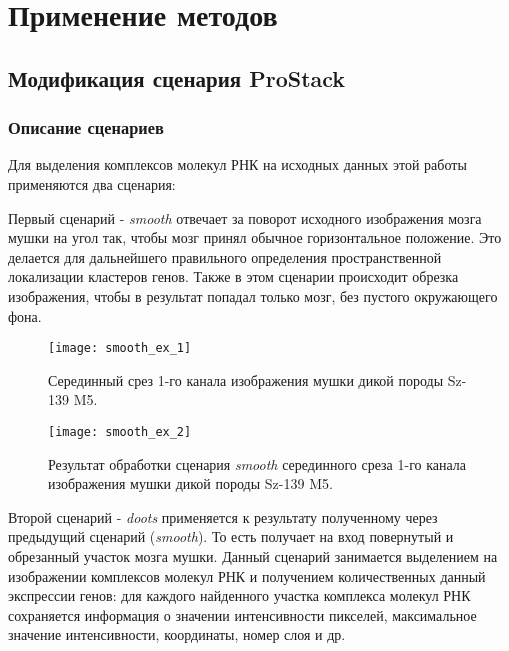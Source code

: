 \chapter{Применение методов} \label{ch3}




\section{Модификация сценария ProStack}
\subsection{Описание сценариев}
Для выделения комплексов молекул РНК на исходных данных этой работы применяются два сценария: 

Первый сценарий - \textit{smooth} отвечает за поворот исходного изображения мозга мушки на угол так, чтобы мозг принял обычное горизонтальное положение. Это делается для дальнейшего правильного определения пространственной локализации кластеров генов. Также в этом сценарии происходит обрезка изображения, чтобы в результат попадал только мозг, без пустого окружающего фона.

\begin{figure}[H]
	\centering
	\texttt{[image: smooth\_ex\_1]}
	\caption{Серединный срез 1-го канала изображения мушки дикой породы Sz-139 M5.}
	\label{smooth_ex_1}
\end{figure}

\begin{figure}[H]
	\centering
	\texttt{[image: smooth\_ex\_2]}
	\caption{Результат обработки сценария \textit{smooth} серединного среза 1-го канала изображения мушки дикой породы Sz-139 M5.}
	\label{smooth_ex_2}
\end{figure}


Второй сценарий - \textit{doots} применяется к результату полученному через предыдущий сценарий (\textit{smooth}). То есть получает на вход повернутый и обрезанный участок мозга мушки. Данный сценарий занимается выделением на изображении комплексов молекул РНК и получением количественных данный экспрессии генов: для каждого найденного участка комплекса молекул РНК сохраняется информация о значении интенсивности пикселей, максимальное значение интенсивности, координаты, номер слоя и др.

